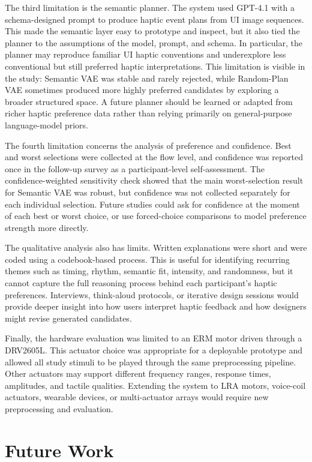 The third limitation is the semantic planner. The system used GPT-4.1 with a schema-designed prompt to produce haptic event plans from UI image sequences. This made the semantic layer easy to prototype and inspect, but it also tied the planner to the assumptions of the model, prompt, and schema. In particular, the planner may reproduce familiar UI haptic conventions and underexplore less conventional but still preferred haptic interpretations. This limitation is visible in the study: Semantic VAE was stable and rarely rejected, while Random-Plan VAE sometimes produced more highly preferred candidates by exploring a broader structured space. A future planner should be learned or adapted from richer haptic preference data rather than relying primarily on general-purpose language-model priors.

The fourth limitation concerns the analysis of preference and confidence. Best and worst selections were collected at the flow level, and confidence was reported once in the follow-up survey as a participant-level self-assessment. The confidence-weighted sensitivity check showed that the main worst-selection result for Semantic VAE was robust, but confidence was not collected separately for each individual selection. Future studies could ask for confidence at the moment of each best or worst choice, or use forced-choice comparisons to model preference strength more directly.

The qualitative analysis also has limits. Written explanations were short and were coded using a codebook-based process. This is useful for identifying recurring themes such as timing, rhythm, semantic fit, intensity, and randomness, but it cannot capture the full reasoning process behind each participant's haptic preferences. Interviews, think-aloud protocols, or iterative design sessions would provide deeper insight into how users interpret haptic feedback and how designers might revise generated candidates.

Finally, the hardware evaluation was limited to an ERM motor driven through a DRV2605L. This actuator choice was appropriate for a deployable prototype and allowed all study stimuli to be played through the same preprocessing pipeline. Other actuators may support different frequency ranges, response times, amplitudes, and tactile qualities. Extending the system to LRA motors, voice-coil actuators, wearable devices, or multi-actuator arrays would require new preprocessing and evaluation.

\section{Future Work}


